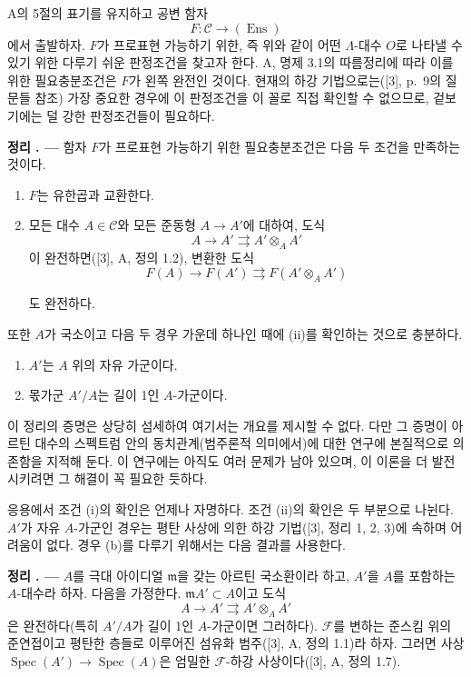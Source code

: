 \documentclass[11pt,twoside,openany]{book}
\numberwithin{equation}{section}
\newcommand{\sourceunit}{front}
\newcommand{\src}[1]{%
  \phantomsection\hypertarget{src:\sourceunit:#1}{}%
  \marginpar{\raggedleft\footnotesize\sffamily #1}%
}
\theoremstyle{plain}
\theoremstyle{definition}
\theoremstyle{remark}
\newcommand{\result}[2]{%
  \par\medskip\noindent\textbf{#1%
  \if\relax\detokenize{#2}\relax\else\space#2\fi. ---}\enspace
}
\begin{document}
A의 5절의 표기를 유지하고 공변 함자
\[
  F:\mathcal C\longrightarrow(\operatorname{Ens})
\]
에서 출발하자. $F$가 프로표현 가능하기 위한, 즉 위와 같이 어떤
$\Lambda$-대수 $O$로 나타낼 수 있기 위한 다루기 쉬운 판정조건을 찾고자
한다. A, 명제 3.1의 따름정리에 따라 이를 위한 필요충분조건은 $F$가 왼쪽
완전인 것이다. 현재의 하강 기법으로는([3], p.~9의 질문들 참조) 가장
중요한 경우에 이 판정조건을 이 꼴로 직접 확인할 수 없으므로, 겉보기에는
덜 강한 판정조건들이 필요하다.

\result{정리}{1} 함자 $F$가 프로표현 가능하기 위한 필요충분조건은 다음
두 조건을 만족하는 것이다.
\begin{enumerate}
\item[(i)] $F$는 유한곱과 교환한다.
\item[(ii)] 모든 대수 $A\in\mathcal C$와 모든 준동형
$A\longrightarrow A'$에 대하여, 도식
\[
  A\longrightarrow A'\rightrightarrows A'\otimes_A A'
\]
이 완전하면([3], A, 정의 1.2), 변환한 도식
\[
  F(A)\longrightarrow F(A')\rightrightarrows F(A'\otimes_A A')
\]

\src{378}
도 완전하다.
\end{enumerate}
또한 $A$가 국소이고 다음 두 경우 가운데 하나인 때에 (ii)를 확인하는
것으로 충분하다.
\begin{enumerate}
\item[(a)] $A'$는 $A$ 위의 자유 가군이다.
\item[(b)] 몫가군 $A'/A$는 길이 1인 $A$-가군이다.
\end{enumerate}

이 정리의 증명은 상당히 섬세하여 여기서는 개요를 제시할 수 없다. 다만
그 증명이 아르틴 대수의 스펙트럼 안의 동치관계(범주론적 의미에서)에 대한
연구에 본질적으로 의존함을 지적해 둔다. 이 연구에는 아직도 여러 문제가
남아 있으며, 이 이론을 더 발전시키려면 그 해결이 꼭 필요한 듯하다.

응용에서 조건 (i)의 확인은 언제나 자명하다. 조건 (ii)의 확인은 두
부분으로 나뉜다. $A'$가 자유 $A$-가군인 경우는 평탄 사상에 의한 하강
기법([3], 정리 1, 2, 3)에 속하며 어려움이 없다. 경우 (b)를 다루기
위해서는 다음 결과를 사용한다.

\result{정리}{2} $A$를 극대 아이디얼 $\mathfrak m$을 갖는 아르틴
국소환이라 하고, $A'$을 $A$를 포함하는 $A$-대수라 하자. 다음을 가정한다.
$\mathfrak mA'\subset A$이고 도식
\[
  A\longrightarrow A'\rightrightarrows A'\otimes_A A'
\]
은 완전하다(특히 $A'/A$가 길이 1인 $A$-가군이면 그러하다).
$\mathcal F$를 변하는 준스킴 위의 준연접이고 평탄한 층들로 이루어진
섬유화 범주([3], A, 정의 1.1)라 하자. 그러면 사상
$\operatorname{Spec}(A')\longrightarrow\operatorname{Spec}(A)$은 엄밀한
$\mathcal F$-하강 사상이다([3], A, 정의 1.7).
\end{document}
